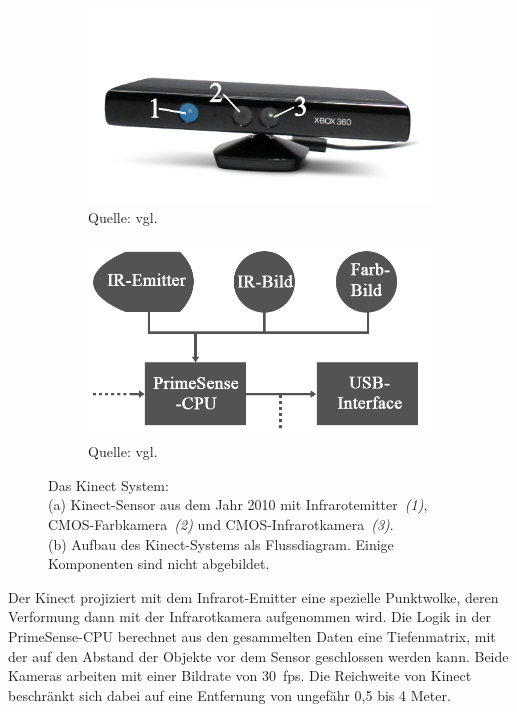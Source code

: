 \begin{figure}[hb]
\centering
\begin{subfigure}{.5\textwidth} 
  \centering
  \includegraphics[width=.95\linewidth]{bilder/kinectSensor.png}
  \caption{Quelle: vgl. \cite{kinectSensorBild}}
  \label{fig:kinectSensor}
\end{subfigure}%
\begin{subfigure}{.5\textwidth} 
  \centering
  \includegraphics[width=.95\linewidth]{bilder/KinectAufbau.png}
  \caption{Quelle: vgl. \cite{kinectAufbauBild}}
  \label{fig:kinectAufbau}
\end{subfigure}
\caption{Das Kinect System: \\ (a) Kinect-Sensor aus dem Jahr 2010 mit Infrarotemitter~\textit{(1)}, CMOS-Farbkamera~\textit{(2)} und CMOS-Infrarotkamera~\textit{(3)}. \\ (b) Aufbau des Kinect-Systems als Flussdiagram. Einige Komponenten sind nicht abgebildet.}
\label{fig:kinextSystem}
\end{figure}

Der Kinect projiziert mit dem Infrarot-Emitter eine spezielle Punktwolke, deren Verformung dann mit der Infrarotkamera aufgenommen wird. Die Logik in der PrimeSense-CPU berechnet aus den gesammelten Daten eine Tiefenmatrix, mit der auf den Abstand der Objekte vor dem Sensor geschlossen werden kann. Beide Kameras arbeiten mit einer Bildrate von 30~fps. Die Reichweite von Kinect beschränkt sich dabei auf eine Entfernung von ungefähr 0,5 bis 4 Meter.~\cite{hannaKinect1} 

